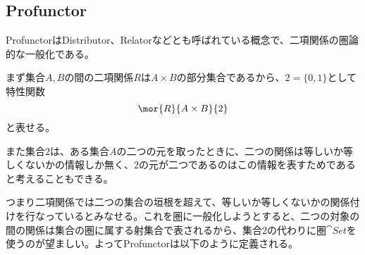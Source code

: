 \documentclass[uplatex,dvipdfmx]{jsarticle}
\begin{document}
  \subsection{Profunctor}
  ProfunctorはDistributor、Relatorなどとも呼ばれている概念で、二項関係の圏論的な一般化である。

  まず集合$A,B$の間の二項関係$R$は$A\times B$の部分集合であるから、$2 = \{0,1\}$として特性関数\[\mor{R}{A\times B}{2}\]と表せる。

  また集合$2$は、ある集合$A$の二つの元を取ったときに、二つの関係は等しいか等しくないかの情報しか無く、$2$の元が二つであるのはこの情報を表すためであると考えることもできる。

  つまり二項関係では二つの集合の垣根を超えて、等しいか等しくないかの関係付けを行なっているとみなせる。これを圏に一般化しようとすると、二つの対象の間の関係は集合の圏に属する射集合で表されるから、集合$2$の代わりに圏$\cat{Set}$を使うのが望ましい。よってProfunctorは以下のように定義される。
\end{document}
